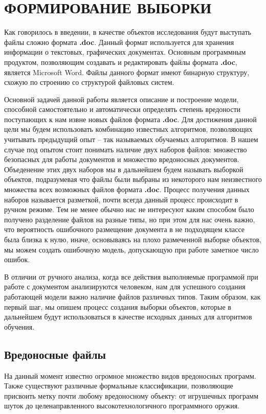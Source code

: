 \chapter{ФОРМИРОВАНИЕ ВЫБОРКИ}

Как говорилось в введении, в качестве объектов исследования будут выступать файлы сложно формата \textbf{.doc}.
Данный формат используется для хранения информации о текстовых, графических документах.
Основным программным продуктом, позволяющим создавать и редактировать файлы формата \textbf{.doc}, является Microsoft Word.
Файлы данного формат имеют бинарную структуру, схожую по строению со структурой файловых систем. \cite{doc_format}

Основной задачей данной работы является описание и построение модели, способной самостоятельно и автоматически определять степень вредоности поступающих к нам извне новых файлов формата \textbf{.doc}.
Для достижения данной цели мы будем использовать комбинацию известных алгоритмов, позволяющих учитывать предыдущий опыт -- так называемых обучаемых алгоритмов.
В нашем случае под опытом стоит понимать наличие двух наборов файлов: множество безопасных для работы документов и множество вредоносных документов.
Объеденение этих двух наборов мы в дальнейшем будем называть выборкой объектов, подразумевая что файлы были выбраны из некоторого нам неизвестного множества всех возможных файлов формата \textbf{.doc}. 
Процесс получения данных наборов называется разметкой, почти всегда данный процесс происходит в ручном режиме.
Тем не менее обычно нас не интересуют каким способом было получено разделение файлов на разные типы, но при этом для нас очень важно, что вероятность ошибочного размещение документа в не подходящем классе была близка к нулю, иначе, основываясь на плохо размеченной выборке объектов, мы можем создать ошибочную модель, допускающую при работе заметное число ошибок.

В отличии от ручного анализа, когда все действия выполняемые программой при работе с документом анализируются человеком, нам для успешного создания работающей модели важно наличие файлов различных типов.
Таким образом, как первый шаг, мы опишем процесс создания выборки объектов, которые в дальнейшем будут использоваться в качестве исходных данных для алгоритмов обучения.

\section{Вредоносные файлы}

На данный момент известно огромное множество видов вредоносных программ.
Также существуют различные формальные классификации, позволяющие присвоить метку почти любому вредоносному объекту: от игрушечных программ шуток до целенаправленного высокотехнологичного программного оружия.

